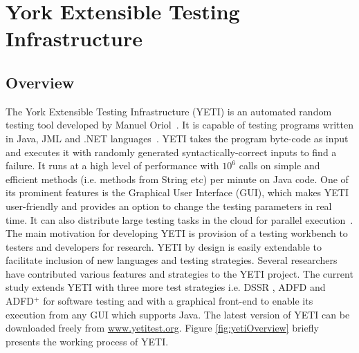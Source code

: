 
\chapter{York Extensible Testing Infrastructure}
\label{chap:yeti_3}





\section{Overview}
The York Extensible Testing Infrastructure (YETI) is an automated random testing tool developed by Manuel Oriol~\cite{Oriol2011yeti}. It is capable of testing programs written in Java, JML and .NET languages~\cite{oriol2010testing}. YETI takes the program byte-code as input and executes it with randomly generated syntactically-correct inputs to find a failure. It runs at a high level of performance with $10^6$ calls on simple and efficient methods (i.e. methods from String etc) per minute on Java code. One of its prominent features is the Graphical User Interface (GUI), which makes YETI user-friendly and provides an option to change the testing parameters in real time. It can also distribute large testing tasks in the cloud for parallel execution~\cite{oriol2010yeti}. The main motivation for developing YETI is provision of a testing workbench to testers and developers for research. YETI by design is easily extendable to facilitate inclusion of new languages and testing strategies. Several researchers \cite{oriol2010testing, oriol2010yeti, Dimitraiadis2009, Khawaja2010} have contributed various features and strategies to the YETI project. The current study extends YETI with three more test strategies i.e. DSSR \cite{ahmad2014dirt}, ADFD \cite{ahmad2013adfd} and ADFD$^+$ \cite{ahmad2014adfd2} for software testing and with a graphical front-end to enable its execution from any GUI which supports Java. The latest version of YETI can be downloaded freely from \url{www.yetitest.org}. Figure \ref{fig:yetiOverview} briefly presents the working process of YETI. 

